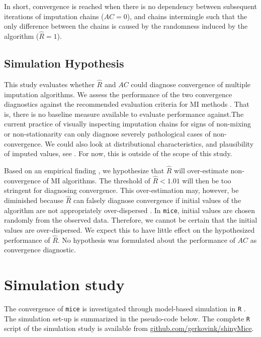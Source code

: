 \documentclass[Royal,times,sageh]{sagej}
\begin{document}
In short, convergence is reached when there is no dependency between
subsequent iterations of imputation chains (\(AC = 0\)), and chains
intermingle such that the only difference between the chains is caused
by the randomness induced by the algorithm (\(\widehat{R} = 1\)).

\hypertarget{simulation-hypothesis}{%
\subsection{Simulation Hypothesis}\label{simulation-hypothesis}}

This study evaluates whether \(\widehat{R}\) and \(AC\) could diagnose
convergence of multiple imputation algorithms. We assess the performance
of the two convergence diagnostics against the recommended evaluation
criteria for MI methods \citep[i.e., average bias, average confidence
interval width, and empirical coverage rate across simulations;][\(\S\)
2.5.2]{buur18}. That is, there is no baseline measure available to
evaluate performance against.The current practice of visually inspecting
imputation chains for signs of non-mixing or non-stationarity can only
diagnose severely pathological cases of non-convergence. We could also
look at distributional characteristics, and plausibility of imputed
values, see \citet{vinknd}. For now, this is outside of the scope of
this study.

Based on an empirical finding \citep{lace07}, we hypothesize that
\(\widehat{R}\) will over-estimate non-convergence of MI algorithms. The
threshold of \(\widehat{R} < 1.01\) will then be too stringent for
diagnosing convergence. This over-estimation may, however, be diminished
because \(\widehat{R}\) can falsely diagnose convergence if initial
values of the algorithm are not appropriately over-dispersed
\citep[p.~437]{broo98}. In \texttt{mice}, initial values are chosen
randomly from the observed data. Therefore, we cannot be certain that
the initial values are over-dispersed. We expect this to have little
effect on the hypothesized performance of \(\widehat{R}\). No hypothesis
was formulated about the performance of \(AC\) as convergence
diagnostic.

\hypertarget{simulation-study}{%
\section{Simulation study}\label{simulation-study}}

The convergence of \texttt{mice} is investigated through model-based
simulation in \texttt{R} \citep[version 3.6.3;][]{R}. The simulation
set-up is summarized in the pseudo-code below. The complete \texttt{R}
script of the simulation study is available from
\href{https://github.com/gerkovink/shinyMice/tree/master/3.Thesis/1.SimulationStudy}{github.com/gerkovink/shinyMice}.
\end{document}
